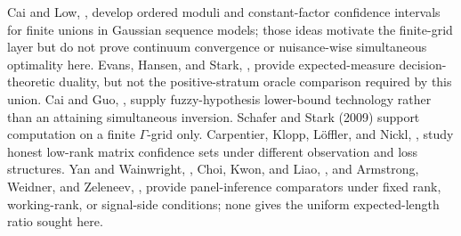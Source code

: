 Cai and Low, \cite{CaiLow2004AdaptiveCI}, develop ordered moduli and constant-factor confidence intervals for finite unions in Gaussian sequence models; those ideas motivate the finite-grid layer but do not prove continuum convergence or nuisance-wise simultaneous optimality here.  Evans, Hansen, and Stark, \cite{EvansHansenStark2005}, provide expected-measure decision-theoretic duality, but not the positive-stratum oracle comparison required by this union.  Cai and Guo, \cite{CaiGuo2017HDLinearCI}, supply fuzzy-hypothesis lower-bound technology rather than an attaining simultaneous inversion.  Schafer and Stark (2009) support computation on a finite \(\Gamma\)-grid only.  Carpentier, Klopp, Löffler, and Nickl, \cite{CarpentierKloppLofflerNickl2018}, study honest low-rank matrix confidence sets under different observation and loss structures.  Yan and Wainwright, \cite{YanWainwright2024MissingPanel}, Choi, Kwon, and Liao, \cite{ChoiKwonLiao2026UnknownRank}, and Armstrong, Weidner, and Zeleneev, \cite{ArmstrongWeidnerZeleneev2026}, provide panel-inference comparators under fixed rank, working-rank, or signal-side conditions; none gives the uniform expected-length ratio sought here.